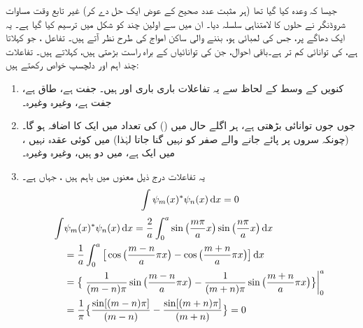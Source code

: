 جیسا کہ وعدہ کیا گیا  تھا   (ہر مثبت عدد صحیح  کے عوض ایک حل دے کر) غیر تابع وقت مساوات شروڈنگر نے حلوں کا   لامتناہی سلسلہ دیا۔ ان میں سے اولین چند کو شکل میں ترسیم کیا گیا ہے۔ یہ ایک دھاگے پر، جس کی لمبائی  ہو،  بننے والی ساکن امواج کی طرح نظر آتے ہیں۔ تفاعل  ، جو  کہلاتا ہے،  کی توانائی   کم تر  ہے۔باقی احوال،  جن کی توانائیاں  کے براہ راست بڑھتی ہیں،   کہلاتے ہیں۔ تفاعلات   چند اہم اور دلچسپ خواص رکھتے ہیں:
\begin{enumerate}[1.]
\item
 کنویں کے وسط کے لحاظ سے یہ تفاعلات باری باری  اور  ہیں۔  جفت ہے،  طاق ہے،  جفت ہے، وغیرہ وغیرہ۔
\item
جوں جوں توانائی بڑھتی ہے، ہر اگلے حال  میں  ()  کی تعداد میں ایک  کا اضافہ ہو گا۔ (چونکہ سروں پر پائے جانے والے صفر کو نہیں گنا جاتا  لہٰذا)  میں کوئی عقدہ نہیں ،  میں ایک ہے،  میں دو   ہیں، وغیرہ وغیرہ۔ 
\item
  یہ تفاعلات درج ذیل معنوں میں باہم  ہیں ، جہاں  ہے۔
\begin{align}
\int\psi_{m}(x)^*\psi_{n}(x)\dif{x}=0
\end{align}
\begin{align*}
\int&\psi_{m}(x)^*\psi_{n}(x)\dif{x}=\frac{2}{a}\int_{0}^{a}\sin\big(\frac{m\pi}{a}x\big)\sin\big(\frac{n\pi}{a}x\big)\dif{x}\\
&=\frac{1}{a}\int_{0}^{a}\big[\cos\big(\frac{m-n}{a}\pi x\big)-\cos\big(\frac{m+n}{a}\pi x\big)\big]\dif{x}\\
&=\big\{\left.\frac{1}{(m-n)\pi}\sin\big(\frac{m-n}{a}\pi x\big)-\frac{1}{(m+n)\pi}\sin\big(\frac{m+n}{a}\pi x\big)\big\}\right\vert_{0}^{a}\\
&=\frac{1}{\pi}\big\{\frac{\sin[(m-n)\pi]}{(m-n)}-\frac{\sin[(m+n)\pi]}{(m+n)}\big\}=0

\end{align*}
\end{enumerate}

